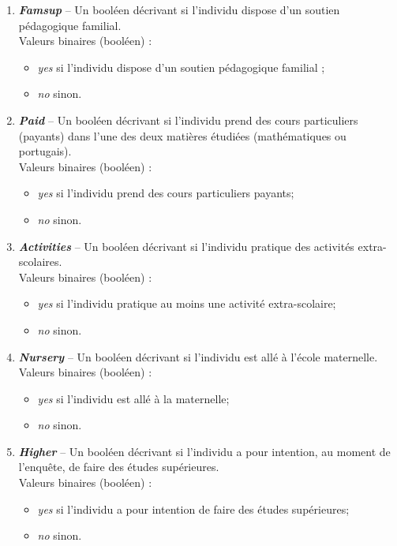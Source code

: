 \documentclass[11pt]{article}
\begin{document}
\begin{enumerate}
\item \textbf{\emph{Famsup}} \--- Un booléen décrivant si l'individu dispose d'un soutien pédagogique familial. 
	\\\textsf{Valeurs binaires (booléen) : }\begin{itemize}
	\item[\textbullet] \emph{yes} si l'individu dispose d'un soutien pédagogique familial ;
	\item[\textbullet] \emph{no} sinon.
	\end{itemize}
	
\item \textbf{\emph{Paid}} \--- Un booléen décrivant si l'individu prend des cours particuliers (payants) dans l'une des deux matières étudiées (mathématiques ou portugais). 
	\\\textsf{Valeurs binaires (booléen) : }\begin{itemize}
	\item[\textbullet] \emph{yes} si l'individu prend des cours particuliers payants;
	\item[\textbullet] \emph{no} sinon.
	\end{itemize}

\item \textbf{\emph{Activities}} \--- Un booléen décrivant si l'individu pratique des activités extra-scolaires. 
	\\\textsf{Valeurs binaires (booléen) : }\begin{itemize}
	\item[\textbullet] \emph{yes} si l'individu pratique au moins une activité extra-scolaire;
	\item[\textbullet] \emph{no} sinon.
	\end{itemize}
	
\item \textbf{\emph{Nursery}} \--- Un booléen décrivant si l'individu est allé à l'école maternelle. 
	\\\textsf{Valeurs binaires (booléen) : }\begin{itemize}
	\item[\textbullet] \emph{yes} si l'individu est allé à la maternelle;
	\item[\textbullet] \emph{no} sinon.
	\end{itemize}
	
\item \textbf{\emph{Higher}} \--- Un booléen décrivant si l'individu a pour intention, au moment de l'enquête, de faire des études supérieures. 
	\\\textsf{Valeurs binaires (booléen) : }\begin{itemize}
	\item[\textbullet] \emph{yes} si l'individu a pour intention de faire des études supérieures;
	\item[\textbullet] \emph{no} sinon.
	\end{itemize}
	

\end{enumerate}
\end{document}
